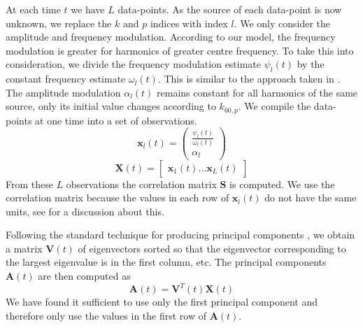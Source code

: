 At each time $t$ we have $L$ data-points. As the source of each data-point is
now unknown, we replace the $k$ and $p$ indices with index $l$. We only consider
the amplitude and frequency modulation. According to our model, the frequency
modulation is greater for harmonics of greater centre frequency. To take this
into consideration, we divide the frequency modulation estimate $\psi_{l}(t)$ by
the constant frequency estimate $\omega_{l}(t)$. This is similar to the approach
taken in \cite{creager2016musicalsource}. The amplitude modulation $\alpha_{l}(t)$
remains constant for all harmonics of the same source, only its initial value
changes according to $k_{60,p}$.  We compile the data-points at one time into a
set of observations.
\begin{equation}
    \mathbf{x}_{l}(t) = \begin{pmatrix}
        \frac{\psi_{l}(t)}{\omega_{l}(t)} \\
        \alpha_{l}
    \end{pmatrix}
\end{equation}
\begin{equation}
    \mathbf{X}(t) = \begin{bmatrix}
        \mathbf{x}_{1}(t) \ldots \mathbf{x}_{L}(t)
    \end{bmatrix}
\end{equation}
From these $L$ observations the correlation matrix $\mathbf{S}$ is computed. We
use the correlation matrix because the values in each row of $\mathbf{x}_{l}(t)$
do not have the same units, see \cite[p.~22]{jolliffe2002principal} for a
discussion about this. 

Following the standard technique for producing principal components
\cite[p.~11]{jolliffe2002principal}, we obtain a matrix $\mathbf{V}(t)$ of
eigenvectors sorted so that the eigenvector corresponding to the largest
eigenvalue is in the first column, etc.  The principal components
$\mathbf{A}(t)$ are then computed as
\begin{equation}
    \mathbf{A}(t) = \mathbf{V}^{T}(t)\mathbf{X}(t)
\end{equation}
We have found it sufficient to use only the first principal component and
therefore only use the values in the first row of $\mathbf{A}(t)$.


